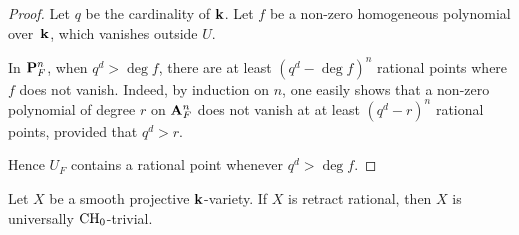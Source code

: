 \begin{proof}
    Let $q$ be the cardinality of $\bbk$.
    Let $f$ be a non-zero homogeneous polynomial over~$\bbk$,
    which vanishes outside $U$.

    In $\bbP_{F}^n$, when $q^d > \deg f$, 
    there are at least $(q^d - \deg f)^n$ rational points
    where $f$ does not vanish.
    Indeed, by induction on $n$, one easily shows that a non-zero polynomial
    of degree $r$ on $\bbA_{F}^n$ does not vanish at at least $(q^d - r)^n$ rational points, provided that $q^d > r$.

    Hence $U_F$ contains a rational point whenever $q^d > \deg f$.
\end{proof}

\begin{theorem}  \label{thm-2}
    Let $X$ be a smooth projective $\bbk$-variety.
    If $X$ is retract rational, then $X$ is universally $\mathrm{CH}_0$-trivial.
\end{theorem}

